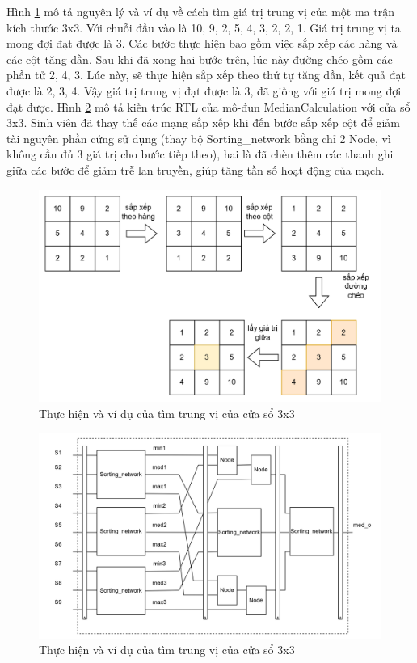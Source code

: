 Hình \ref{fig:median3x3Exampel} mô tả nguyên lý và ví dụ về cách tìm giá trị trung vị của một ma trận kích thước 3x3. Với chuỗi đầu vào là 10, 9, 2, 5, 4, 3, 2, 2, 1. Giá trị trung vị ta mong đợi đạt được là 3. Các bước thực hiện bao gồm việc sắp xếp các hàng và các cột tăng dần. Sau khi đã xong hai bước trên, lúc này đường chéo gồm các phần tử 2, 4, 3. Lúc này, sẽ thực hiện sắp xếp theo thứ tự tăng dần, kết quả đạt được là 2, 3, 4. Vậy giá trị trung vị đạt được là 3, đã giống với giá trị mong đợi đạt được.  Hình \ref{fig:median3x3RTL} mô tả kiến trúc RTL của mô-đun MedianCalculation với cửa sổ 3x3. Sinh viên đã thay thế các mạng sắp xếp khi đến bước sắp xếp cột để giảm tài nguyên phần cứng sử dụng (thay bộ Sorting\_network bằng chỉ 2 Node, vì không cần đủ 3 giá trị cho bước tiếp theo), hai là đã chèn thêm các thanh ghi giữa các bước để giảm trễ lan truyền, giúp tăng tần số hoạt động của mạch.
\begin{figure}[!ht]
	\centering
	\includegraphics[width=0.6\linewidth]{figures/median3x3Exampel.png}
	\caption{Thực hiện và ví dụ của tìm trung vị của cửa sổ 3x3}
	\label{fig:median3x3Exampel}
\end{figure}
\begin{figure}[H]
	\centering
	\includegraphics[width=\linewidth]{figures/median3x3RTL.png}
	\caption{Thực hiện và ví dụ của tìm trung vị của cửa sổ 3x3}
	\label{fig:median3x3RTL}
\end{figure}


